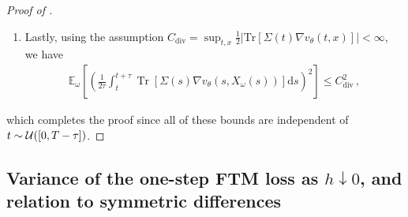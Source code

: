 \documentclass[oneside,11pt]{article}
\theoremstyle{remark}
\DeclareMathOperator{\Tr}{Tr}
\begin{document}
\begin{proof}[Proof of ]
\begin{enumerate}
\begin{align*}
&\leq \frac{1}{\tau^2} \mathbb{E}_\omega  \left[ \int_{t}^{t+\tau} \sigma_{\max} \lVert v_\theta(s, X_\omega(s)) \rVert_2^2 \mathrm{d}s \right] \leq \frac{\sigma_{\max} V^2}{\tau}\,.
\end{align*}
\item Lastly, using the assumption $C_{\text{div}} = \sup_{t,x} \frac{1}{2} \lvert \text{Tr}\left[\Sigma(t) \nabla v_\theta(t,x) \right] \rvert < \infty$, we have 
\begin{align*}
\mathbb{E}_\omega  \left[ \left( \frac{1}{2\tau} \int_{t}^{t+\tau} \Tr \left[\Sigma(s) \nabla v_\theta(s, X_{\omega}(s)) \right] \mathrm{d}s \right)^2 \right] \leq C_{\text{div}}^2\,,
\end{align*}
\end{enumerate}
which completes the proof since all of these bounds are independent of $ t \sim {\cal U}([0, T - \tau])$.
\end{proof}



\subsection{Variance of the one-step FTM loss as $h \downarrow 0$, and relation to symmetric differences}\label{appendix:SymEstimatorUnstable}
\end{document}
